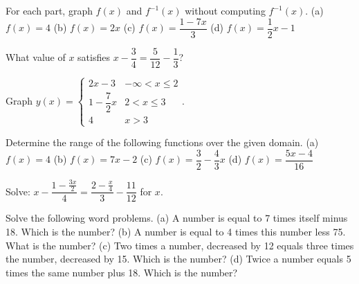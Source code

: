 \documentclass[../book.tex]{subfiles}
\begin{document}
\begin{reviewset}
\item For each part, graph $f(x)$ and $f^{-1}(x)$ without computing $f^{-1}(x)$.  \newline 
(a) $f(x)=4$ \hspace{60mm} (b) $f(x)=2x$ \newline 
(c) $f(x)=\dfrac{1-7x}{3}$ \hspace{50mm} (d) $f(x)=\dfrac{1}{2}x-1$ \vspace{3mm}

\item What value of $x$ satisfies $x-\dfrac{3}{4}=\dfrac{5}{12}-\dfrac{1}{3}$? \vspace{3mm}

\item Graph $y(x)=\begin{cases} 2x-3 & -\infty < x \leq 2 \\ 1-\dfrac{7}{2}x & 2 < x \leq 3 \\ 4 & x > 3 \end{cases}$.  \vspace{3mm}

\item Determine the range of the following functions over the given domain.  \newline
(a) $f(x)=4$ \hspace{60mm} (b) $f(x)=7x-2$ \newline 
(c) $f(x)=\dfrac{3}{2}-\dfrac{4}{3}x$ \hspace{49mm} (d) $f(x)=\dfrac{5x-4}{16}$ \vspace{3mm}

\item Solve: $x-\dfrac{1-\frac{3x}{2}}{4}=\dfrac{2-\frac{x}{4}}{3}-\dfrac{11}{12}$ for $x$.  \vspace{3mm}

\item Solve the following word problems.  \newline 
(a) A number is equal to 7 times itself minus 18.  Which is the number? \newline 
(b) A number is equal to 4 times this number less 75.  What is the number? \newline 
(c) Two times a number, decreased by 12 equals three times the number, decreased by 15.  Which is the number? \newline 
(d) Twice a number equals 5 times the same number plus 18.  Which is the number? \vspace{3mm}


\end{reviewset}
\end{document}
